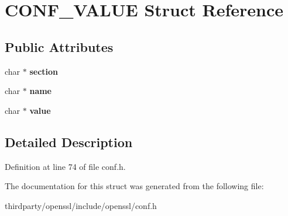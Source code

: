 \hypertarget{struct_c_o_n_f___v_a_l_u_e}{}\section{C\+O\+N\+F\+\_\+\+V\+A\+L\+UE Struct Reference}
\label{struct_c_o_n_f___v_a_l_u_e}
\subsection*{Public Attributes}
\begin{DoxyCompactItemize}
\item 
\mbox{\label{struct_c_o_n_f___v_a_l_u_e_a103e4a73b3523e1a3e4d4fd8f32a7fe0}} 
char $\ast$ {\bfseries section}
\item 
\mbox{\label{struct_c_o_n_f___v_a_l_u_e_a11c4d31c2078948fab12fd3fe2f75bbc}} 
char $\ast$ {\bfseries name}
\item 
\mbox{\label{struct_c_o_n_f___v_a_l_u_e_adc4e5ad327beced987b0d51bc4bdeb6e}} 
char $\ast$ {\bfseries value}
\end{DoxyCompactItemize}


\subsection{Detailed Description}


Definition at line 74 of file conf.\+h.



The documentation for this struct was generated from the following file\+:\begin{DoxyCompactItemize}
\item 
thirdparty/openssl/include/openssl/conf.\+h\end{DoxyCompactItemize}
